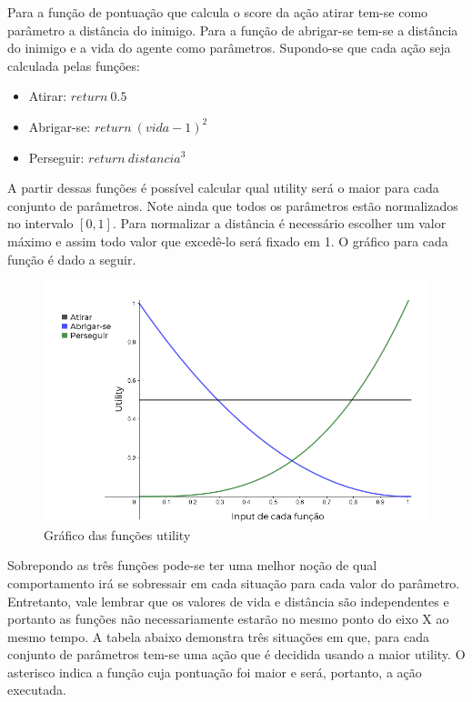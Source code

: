 \documentclass[12pt, 
openright, 
oneside, 
a4paper,    
brazil]{facom-ufu-abntex2}
\begin{document}
Para a função de pontuação que calcula o score da ação atirar tem-se como parâmetro a distância do inimigo. Para a função de abrigar-se tem-se a distância do inimigo e a vida do agente como parâmetros. Supondo-se que cada ação seja calculada pelas funções:

\begin{itemize}
    \item Atirar: $return~0.5$
    \item Abrigar-se: $return~(vida - 1)^2$
    \item Perseguir: $return~distancia^3$
\end{itemize}

 A partir dessas funções é possível calcular qual utility será o maior para cada conjunto de parâmetros. Note ainda que todos os parâmetros estão normalizados no intervalo $[0,1]$. Para normalizar a distância é necessário escolher um valor máximo e assim todo valor que excedê-lo será fixado em 1. O gráfico para cada função é dado a seguir.
 
\begin{figure}[H]
	\centering
	\includegraphics[width=34em]{imagens/utilityFunctions.png}
	\caption{Gráfico das funções utility}
\end{figure}

 
 Sobrepondo as três funções pode-se ter uma melhor noção de qual comportamento irá se sobressair em cada situação para cada valor do parâmetro. Entretanto, vale lembrar que os valores de vida e distância são independentes e portanto as funções não necessariamente estarão no mesmo ponto do eixo X ao mesmo tempo.
 A tabela abaixo demonstra três situações em que, para cada conjunto de parâmetros tem-se uma ação que é decidida usando a maior utility. O asterisco indica a função cuja pontuação foi maior e será, portanto, a ação executada.
 
\end{document}
